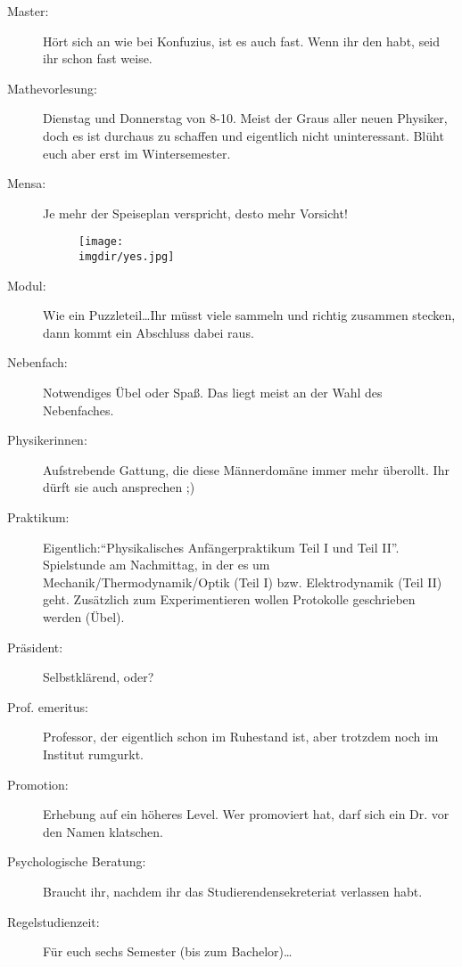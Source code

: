 \begin{description}
	\item[Master:] Hört sich an wie bei Konfuzius, ist es auch fast. Wenn ihr den habt, seid ihr schon fast weise.

    \item[Mathevorlesung:] Dienstag und Donnerstag von 8-10. Meist der Graus aller neuen Physiker, doch es ist durchaus zu schaffen und eigentlich nicht uninteressant. Blüht euch aber erst im Wintersemester.

    \item[Mensa:] Je mehr der Speiseplan verspricht, desto mehr Vorsicht!

\begin{figure}[!h]
 	\centering
  	\texttt{[image: \\imgdir/yes.jpg]}
\end{figure}

	\item[Modul:] Wie ein Puzzleteil\ldots Ihr müsst viele sammeln und richtig zusammen stecken, dann kommt ein Abschluss dabei raus.

    \item[Nebenfach:] Notwendiges Übel oder Spaß. Das liegt meist an der Wahl des Nebenfaches.

    \item[Physikerinnen:] Aufstrebende Gattung, die diese Männerdomäne immer mehr überollt. Ihr dürft sie auch ansprechen ;)

    \item[Praktikum:] Eigentlich:\enquote{Physikalisches Anfängerpraktikum Teil I und Teil II}. Spielstunde am Nachmittag, in der es um Mechanik/Thermodynamik/Optik (Teil I) bzw. Elektrodynamik (Teil II) geht. Zusätzlich zum Experimentieren wollen Protokolle geschrieben werden (Übel).

    \item[Präsident:] Selbstklärend, oder?

    \item[Prof. emeritus:] Professor, der eigentlich schon im Ruhestand ist, aber trotzdem noch im Institut rumgurkt.

    \item[Promotion:] Erhebung auf ein höheres Level. Wer promoviert hat, darf sich ein Dr. vor den Namen klatschen.

	\item[Psychologische Beratung:] Braucht ihr, nachdem ihr das Studierendensekreteriat verlassen habt.

    \item[Regelstudienzeit:] Für euch sechs Semester (bis zum Bachelor)\ldots


\end{description}
